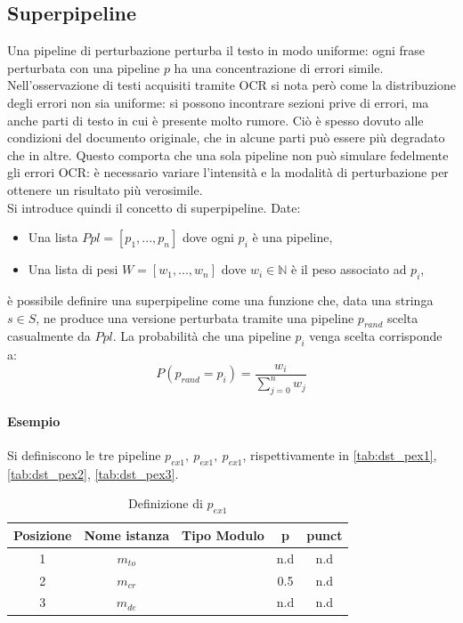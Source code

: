 \subsection{Superpipeline}
\label{sec:dst:superpipeline}
Una pipeline di perturbazione perturba il testo in modo uniforme: ogni frase perturbata con una pipeline $p$ ha una concentrazione di errori simile. Nell'osservazione di testi acquisiti tramite OCR si nota però come la distribuzione degli errori non sia uniforme: si possono incontrare sezioni prive di errori, ma anche parti di testo in cui è presente molto rumore. Ciò è spesso dovuto alle condizioni del documento originale, che in alcune parti può essere più degradato che in altre. Questo comporta che una sola pipeline non può simulare fedelmente gli errori OCR: è necessario variare l'intensità e la modalità di perturbazione per ottenere un risultato più verosimile.\\
Si introduce quindi il concetto di superpipeline. Date:
\begin{itemize}
\item Una lista $\textit{Ppl} = [p_1,...,p_n]$ dove ogni $p_i$ è una pipeline,
\item Una lista di pesi $W = [w_1,...,w_n]$ dove $w_i \in \mathbb{N}$ è il peso associato ad $p_i$,
\end{itemize}
è possibile definire una superpipeline come una funzione che, data una stringa $s \in S$, ne produce una versione perturbata tramite una pipeline $p_{rand}$ scelta casualmente da $\textit{Ppl}$. La probabilità che una pipeline $p_i$ venga scelta corrisponde a:
\begin{equation}
P(p_{rand} = p_i) = \frac{w_i}
{{\sum_{j=0}^{n}}w_j}
\end{equation}


\paragraph{Esempio}
Si definiscono le tre pipeline $p_{ex1},\ p_{ex1},\ p_{ex1}$, rispettivamente in \autoref{tab:dst_pex1}, \autoref{tab:dst_pex2}, \autoref{tab:dst_pex3}. 
\begin{table}[H]
\centering
\begin{tabular}{ccccc}
\textbf{Posizione} & \textbf{Nome istanza} & \textbf{Tipo Modulo} & \textbf{p} & \textbf{punct}\\ \hline
1	& $m_{to}$	& \mto	& n.d 	& n.d 	\\
2	& $m_{cr}$	& \mcr	& 0.5	& n.d 	\\
3	& $m_{de}$	& \mde	& n.d 	& n.d 	\\
\end{tabular}
\caption{Definizione di $p_{ex1}$}
\label{tab:dst_pex1}
\end{table}

